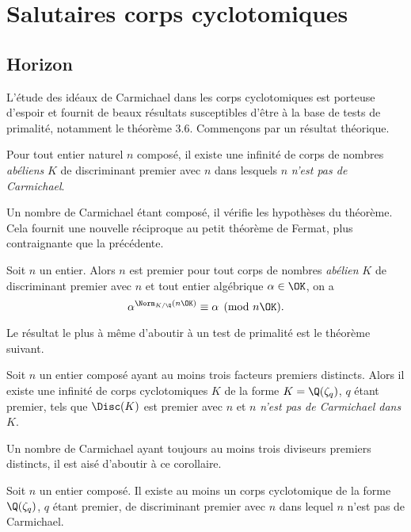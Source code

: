\section{Salutaires corps cyclotomiques}

\subsection{Horizon}

L'étude des idéaux de Carmichael dans les corps cyclotomiques est porteuse d'espoir et fournit de beaux résultats susceptibles d'être à la base de tests de primalité, notamment le théorème 3.6. Commençons par un résultat théorique.

\begin{theoreme}
	Pour tout entier naturel $n$ composé, il existe une infinité de corps de nombres \emph{abéliens} $K$ de discriminant premier avec $n$ dans lesquels $n$ \emph{n'est pas de Carmichael}.
\end{theoreme}

Un nombre de Carmichael étant composé, il vérifie les hypothèses du théorème. Cela fournit une nouvelle réciproque au petit théorème de Fermat, plus contraignante que la précédente.

\begin{theoreme}
	Soit $n$ un entier. Alors $n$ est premier \ssi pour tout corps de nombres \emph{abélien} $K$ de discriminant premier avec $n$ et tout entier algébrique $\alpha \in \OK$, on a $$\alpha^{\Norm_{K/\Q}(n\OK)} \equiv \alpha \pmod{n\OK}.$$
\end{theoreme}

Le résultat le plus à même d'aboutir à un test de primalité est le théorème suivant.

\begin{theoreme}
	Soit $n$ un entier composé ayant au moins trois facteurs premiers distincts. Alors il existe une infinité de corps cyclotomiques $K$ de la forme $K = \Q(\zeta_q)$, $q$ étant premier, tels que $\Disc(K)$ est premier avec $n$ et $n$ \emph{n'est pas de Carmichael dans $K$}.
\end{theoreme}

Un nombre de Carmichael ayant toujours au moins trois diviseurs premiers distincts, il est aisé d'aboutir à ce corollaire.

\begin{corollaire}\label{corollaire-3.7}
	Soit $n$ un entier composé. Il existe au moins un corps cyclotomique de la forme $\Q(\zeta_q)$, $q$ étant premier, de discriminant premier avec $n$ dans lequel $n$ n'est pas de Carmichael.
\end{corollaire}

